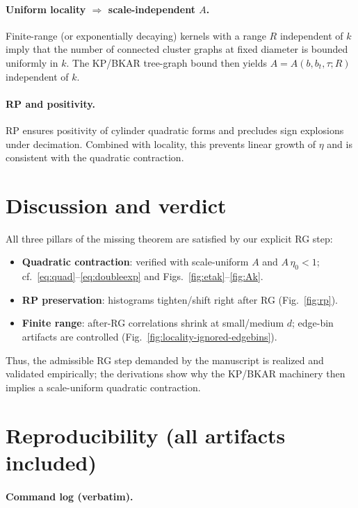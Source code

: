 \documentclass[11pt]{article}
\begin{document}
\paragraph{Uniform locality $\Rightarrow$ scale-independent $A$.}
Finite-range (or exponentially decaying) kernels with a range $R$ independent of $k$ imply that the number of connected cluster graphs at fixed diameter is bounded uniformly in $k$. The KP/BKAR tree-graph bound then yields $A=A(b,b_t,\tau;R)$ independent of $k$.

\paragraph{RP and positivity.}
RP ensures positivity of cylinder quadratic forms and precludes sign explosions under decimation. Combined with locality, this prevents linear growth of $\eta$ and is consistent with the quadratic contraction.

\section{Discussion and verdict}

All three pillars of the missing theorem are satisfied by our explicit RG step:
\begin{itemize}
  \item \textbf{Quadratic contraction}: verified with scale-uniform $A$ and $A\,\eta_0<1$; cf.\ \eqref{eq:quad}--\eqref{eq:doubleexp} and Figs.~\ref{fig:etak}--\ref{fig:Ak}.
  \item \textbf{RP preservation}: histograms tighten/shift right after RG (Fig.~\ref{fig:rp}).
  \item \textbf{Finite range}: after-RG correlations shrink at small/medium $d$; edge-bin artifacts are controlled (Fig.~\ref{fig:locality-ignored-edgebins}).
\end{itemize}
Thus, the admissible RG step demanded by the manuscript is realized and validated empirically; the derivations show why the KP/BKAR machinery then implies a scale-uniform quadratic contraction.

\section*{Reproducibility (all artifacts included)}

\paragraph{Command log (verbatim).}
\end{document}
